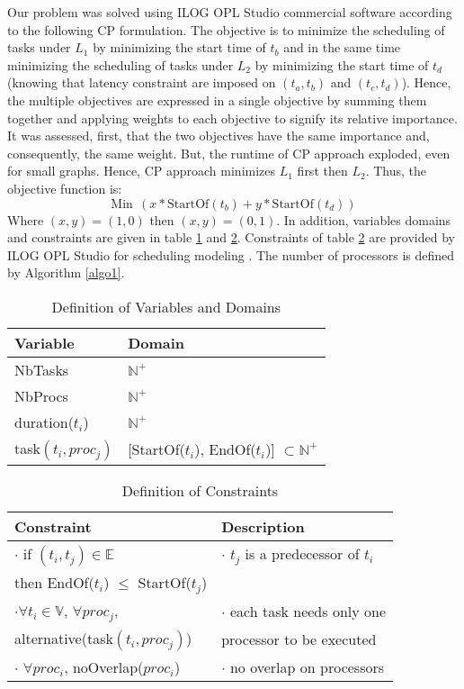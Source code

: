 \documentclass{ijcaArticle}
\begin{document}
Our problem was solved using ILOG OPL Studio commercial software according to the following CP formulation. The objective is to minimize the scheduling of tasks under $L_1$ by minimizing the start time of $t_b$ and in the same time minimizing the scheduling of tasks under $L_2$ by minimizing the start time of $t_d$  (knowing that latency constraint are imposed on $(t_a,t_b)$ and $(t_c,t_d)$). Hence, the multiple objectives are expressed in a single objective by summing them together and applying weights to each objective to signify its relative importance. It was assessed, first, that the two objectives have the same importance and, consequently, the same weight. But, the runtime of CP approach exploded, even for small graphs. Hence, CP approach minimizes $L_1$ first then $L_2$. Thus, the objective function is:  
\begin{equation}\nonumber
\mathrm{Min} \ \ (x*\mathrm{StartOf}(t_b) + y*\mathrm{StartOf}(t_d))
\end{equation}
Where $(x,y)=(1,0)$ then $(x,y)=(0,1)$.  In addition, variables domains and constraints are given in table \ref{table1} and \ref{table2}. Constraints of table \ref{table2} are provided by ILOG OPL Studio for scheduling modeling \cite{ilog}.  The number of processors is defined by Algorithm \ref{algo1}. 
  

\begin{table}[tp] \caption{Definition of Variables and Domains}
\label{table1}\centering \begin{tabular}{l|l}
\hline    Variable  & Domain    \\  \hline
NbTasks& $\mathbb{N}^+$       \\ NbProcs  & $\mathbb{N}^+$       \\duration($t_i$)  & $\mathbb{N}^+$    \\ 
task$(t_i,proc_j)$ &  [StartOf($t_i$), EndOf($t_i$)] $\subset \mathbb{N}^+$  \\  \hline
\end{tabular}
\end{table}

\begin{table}[tp] \caption{Definition of Constraints}
\label{table2}\centering \begin{tabular}{l|l}
\hline
Constraint  &  Description \\ \hline
$\cdot$ if $(t_i,t_j)\in \mathbb{E}$ &  $\cdot$ $t_j$ is a predecessor of  $t_i$  \\  then EndOf($t_i$) $\leq$ StartOf($t_j$)  & \\
$\cdot$$\forall t_i \in   \mathbb{V}$, $\forall  proc_j$,  & $\cdot$ each task needs only one \\ alternative(task$(t_i,proc_j)$) & processor to be executed \\
$\cdot$ $ \forall proc_i$,  noOverlap($proc_i$) &   $\cdot$ no overlap on processors \\ \hline \end{tabular}
\end{table}
\end{document}
